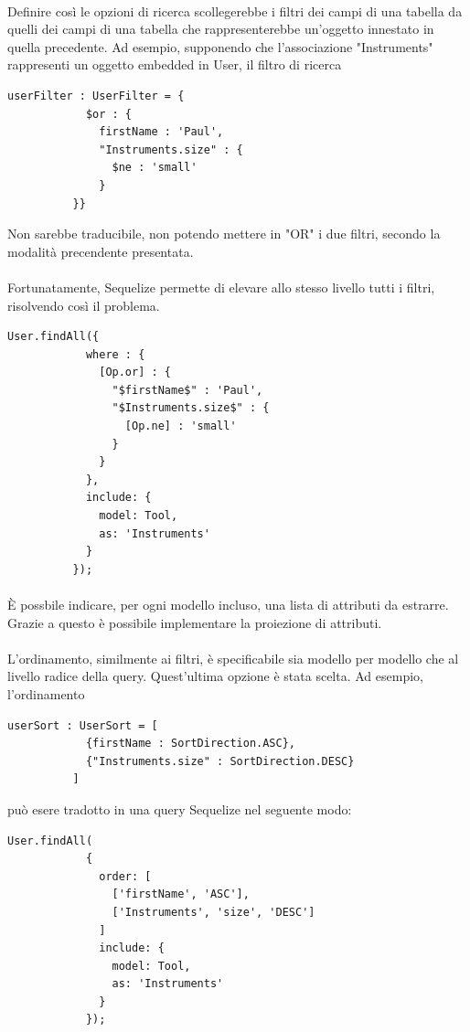 \documentclass[a4paper, 12pt]{report}
\begin{document}
        \paragraph*{}
        Definire così le opzioni di ricerca scollegerebbe i filtri dei campi di una tabella da quelli dei campi di una tabella che rappresenterebbe un'oggetto innestato in quella precedente.
        Ad esempio, supponendo che l'associazione "Instruments" rappresenti un oggetto embedded in User, il filtro di ricerca
        \begin{Verbatim}[samepage=true]
          userFilter : UserFilter = {
            $or : {
              firstName : 'Paul', 
              "Instruments.size" : {
                $ne : 'small'
              }
          }}
        \end{Verbatim}
        Non sarebbe traducibile, non potendo mettere in "OR" i due filtri, secondo la modalità precendente presentata.
        \paragraph*{} 
        Fortunatamente, Sequelize permette di elevare allo stesso livello tutti i filtri, risolvendo così il problema.
        \begin{Verbatim}[samepage=true]
          User.findAll({
            where : {
              [Op.or] : {
                "$firstName$" : 'Paul', 
                "$Instruments.size$" : {
                  [Op.ne] : 'small'
                }
              }
            },
            include: {
              model: Tool,
              as: 'Instruments'
            }
          });
        \end{Verbatim}
        \paragraph*{}
        È possbile indicare, per ogni modello incluso, una lista di attributi da estrarre. Grazie a questo è possibile implementare la proiezione di attributi.
        \paragraph*{}
        L'ordinamento, similmente ai filtri, è specificabile sia modello per modello che al livello radice della query. Quest'ultima opzione è stata scelta.
        Ad esempio, l'ordinamento
        \begin{Verbatim}[samepage=true]
          userSort : UserSort = [
            {firstName : SortDirection.ASC},
            {"Instruments.size" : SortDirection.DESC}
          ]
        \end{Verbatim}
        può esere tradotto in una query Sequelize nel seguente modo:
        \begin{Verbatim}[samepage=true]
          User.findAll(
            {
              order: [
                ['firstName', 'ASC'],
                ['Instruments', 'size', 'DESC']
              ]
              include: {
                model: Tool,
                as: 'Instruments'
              }
            });
        \end{Verbatim}
\end{document}
